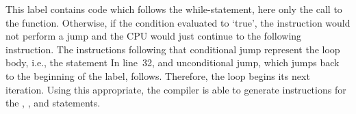This label contains code which follows the while-statement, here only the call to the  function.
Otherwise, if the condition evaluated to `true', the  instruction would not perform a jump and the CPU would just continue to the following instruction.
The instructions following that conditional jump represent the loop body, i.e., the statement 
In line~32, and unconditional jump, which jumps back to the beginning of the  label, follows.
Therefore, the loop begins its next iteration.
Using this appropriate, the compiler is able to generate instructions for the , , and  statements.
